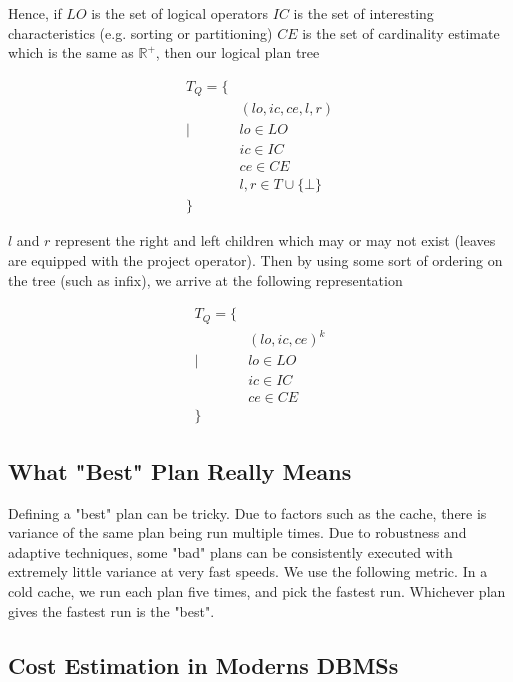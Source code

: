 \documentclass[sigconf,nonacm]{acmart}
\begin{document}
Hence, if $LO$ is the set of logical operators
$IC$ is the set of interesting characteristics (e.g. sorting or partitioning)
$CE$ is the set of cardinality estimate which is the same as $\mathbb{R^+}$, then our logical plan tree

\begin{equation}
\begin{aligned}
T_Q = \{ \\
    &(lo, ic, ce, l, r) \\
    \mid \, &lo \in LO \\
    &ic \in IC\\
    &ce \in CE\\
    &l, r \in T \cup \{\bot\} \\
    \}
\end{aligned}
\end{equation}

$l$ and $r$ represent the right and left children which may or may not exist (leaves are equipped with the project operator). Then by using some sort of ordering on the tree (such as infix), we arrive at the following representation 

\begin{equation}
\begin{aligned}
T_Q = \{ \\
    &(lo, ic, ce)^k \\
    \mid \, &lo \in LO \\
    &ic \in IC\\
    &ce \in CE\\
    \}
\end{aligned}
\end{equation}

\subsection{What "Best" Plan Really Means}

Defining a "best" plan can be tricky. Due to factors such as the cache, there is variance of the same plan being run multiple times. Due to robustness and adaptive techniques, some "bad" plans can be consistently executed with extremely little variance at very fast speeds. We use the following metric. In a cold cache, we run each plan five times, and pick the fastest run. Whichever plan gives the fastest run is the "best". 

\subsection{Cost Estimation in Moderns DBMSs}
\end{document}
